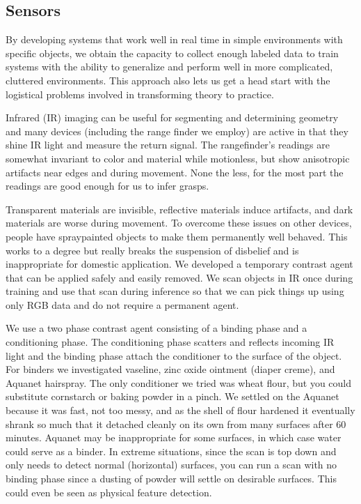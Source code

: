 \documentclass[graybox]{svmult}
\begin{document}
\subsection{Sensors}
By developing systems that work well in real time in simple environments with
specific objects, we obtain the capacity to collect enough labeled data to
train systems with the ability to generalize and perform well in more
complicated, cluttered environments. This approach also lets us get a head
start with the logistical problems involved in transforming theory to practice.

Infrared (IR) imaging can be useful for segmenting and determining geometry and
many devices (including the range finder we employ) are active in that they
shine IR light and measure the return signal. The rangefinder’s readings are
somewhat invariant to color and material while motionless, but show anisotropic
artifacts near edges and during movement. None the less, for the most part the
readings are good enough for us to infer grasps. 

Transparent materials are invisible, reflective materials induce artifacts, and
dark materials are worse during movement. To overcome these issues on other
devices, people have spraypainted objects to make them permanently well
behaved. This works to a degree but really breaks the suspension of disbelief
and is inappropriate for domestic application. We developed a temporary
contrast agent that can be applied safely and easily removed. We scan objects
in IR once during training and use that scan during inference so that we can
pick things up using only RGB data and do not require a permanent agent.

We use a two phase contrast agent consisting of a binding phase and a
conditioning phase. The conditioning phase scatters and reflects incoming IR
light and the binding phase attach the conditioner to the surface of the
object. For binders we investigated vaseline, zinc oxide ointment (diaper
creme), and Aquanet hairspray. The only conditioner we tried was wheat flour,
but you could substitute cornstarch or baking powder in a pinch. We settled on
the Aquanet because it was fast, not too messy, and as the shell of flour
hardened it eventually shrank so much that it detached cleanly on its own from
many surfaces after 60 minutes. Aquanet may be inappropriate for some surfaces,
in which case water could serve as a binder. In extreme situations, since the
scan is top down and only needs to detect normal (horizontal) surfaces, you can
run a scan with no binding phase since a dusting of powder will settle on
desirable surfaces. This could even be seen as physical feature detection.
\end{document}
